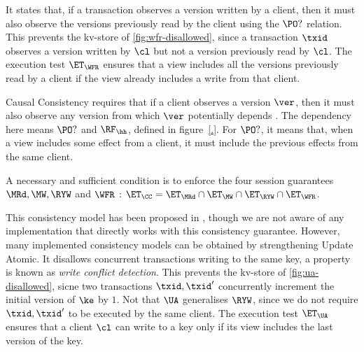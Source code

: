 It states that, if a transaction observes a version written by a
client, then it must also observe the versions previously read by the
client using  the $\PO?$ relation.
This prevents the kv-store of \cref{fig:wfr-disallowed},
since  a transaction $\txid$ observes a version written by $\cl$ but
not a version  previously read by $\cl$.
The execution test $\ET_{\WFR}$  ensures
that a view includes all the versions previously read by a client 
if the view already includes a write from that client. 

Causal Consistency requires that if a client observes a version $\ver$, 
then it must also observe any version from which $\ver$ potentially depends \cite{cops}. 
The dependency here means $\PO?$  and $    \RF_{\hh}$, defined  in
figure~\ref{.}. For $\PO?$, it means that, when a view includes some effect from a client, 
it must include the previous effects  from the same client.


A necessary and sufficient condition is to enforce the four session
guarantees $\MRd, \MW, \RYW$ and $\WFR$ \cite{session2causal}:
$\ET_{\CC} = \ET_{\MRd} \cap \ET_{\MW} \cap \ET_{\RYW} \cap
\ET_{\WFR}$.


This consistency model has been proposed in \cite{framework-concur}, 
though we are not aware of any implementation that directly works with
this consistency guarantee. 
However, many implemented consistency models can be obtained by
strengthening Update Atomic.
It disallows concurrent transactions writing to the same key,
a property is known as \emph{write conflict detection}.
This prevents the kv-store of \cref{fig:ua-disallowed},
sicne two transactions $\txid, \txid'$ concurrently increment the initial version of $\ke$ by $1$.
Not that $\UA$ generalises $\RYW$, 
since we do not require $\txid, \txid'$ to be executed by the same client.
The execution test $\ET_\UA$  ensures that 
a client $\cl$ can write to a key 
only if its view includes the last version of
the key. 

